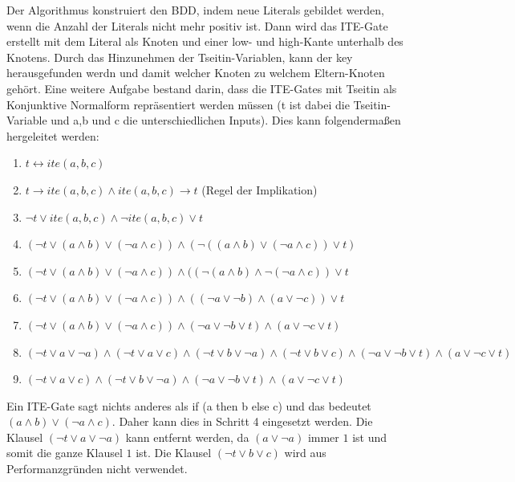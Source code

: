 \documentclass[a4,abstract=on]{scrartcl}
\begin{document}
Der Algorithmus konstruiert den BDD, indem neue Literals gebildet werden, wenn die Anzahl der Literals nicht mehr positiv ist. Dann wird das ITE-Gate erstellt mit dem Literal als Knoten und einer low- und high-Kante unterhalb des Knotens. Durch das Hinzunehmen der Tseitin-Variablen, kann der key herausgefunden werdn und damit welcher Knoten zu welchem Eltern-Knoten gehört. Eine weitere Aufgabe bestand darin, dass die ITE-Gates mit Tseitin als Konjunktive Normalform repräsentiert werden müssen (t ist dabei die Tseitin-Variable und a,b und c die unterschiedlichen Inputs). Dies kann folgendermaßen hergeleitet werden:\\
\begin{enumerate}
\item $t \leftrightarrow ite(a,b,c)$
\item $t \rightarrow ite (a,b,c) \wedge ite (a,b,c) \rightarrow t$ (Regel der Implikation)
\item $\neg t \vee ite(a,b,c) \wedge \neg ite(a,b,c) \vee t$
\item $(\neg t \vee (a \wedge b) \vee (\neg a \wedge c)) \wedge (\neg((a \wedge b) \vee (\neg a \wedge c)) \vee t)$
\item $(\neg t \vee (a \wedge b) \vee (\neg a \wedge c)) \wedge ((\neg(a \wedge b) \wedge \neg (\neg a \wedge c)) \vee t$
\item $(\neg t \vee (a \wedge b) \vee (\neg a \wedge c)) \wedge ((\neg a \vee \neg b) \wedge (a \vee \neg c)) \vee t$
\item $(\neg t \vee (a \wedge b) \vee (\neg a \wedge c)) \wedge (\neg a \vee \neg b \vee t) \wedge (a \vee \neg c \vee t)$
\item $(\neg t \vee a \vee \neg a) \wedge (\neg t \vee a\vee c) \wedge (\neg t \vee b \vee \neg a) \wedge (\neg t \vee b \vee c) \wedge (\neg a \vee \neg b \vee t) \wedge (a \vee \neg c \vee t)$
\item $(\neg t \vee a\vee c) \wedge (\neg t \vee b \vee \neg a) \wedge (\neg a \vee \neg b \vee t) \wedge (a \vee \neg c \vee t)$
\end{enumerate}

Ein ITE-Gate sagt nichts anderes als if (a then b else c) und das bedeutet $(a \wedge b) \vee (\neg a \wedge c)$. Daher kann dies in Schritt 4 eingesetzt werden. Die Klausel $(\neg t \vee a \vee \neg a)$ kann entfernt werden, da $(a \vee \neg a)$ immer $1$ ist und somit die ganze Klausel $1$ ist. Die Klausel $(\neg t \vee b \vee c)$ wird aus Performanzgründen nicht verwendet. %
\end{document}
